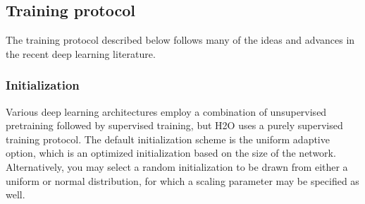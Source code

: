 \documentclass{article}[11pt]
\begin{document}
\subsection{Training protocol} 
The training protocol described below follows many of the ideas and advances in the recent deep learning literature.

\subsubsection{Initialization}
\label{sssec:Initialization}
\noindent
Various deep learning architectures employ a combination of unsupervised pretraining followed by supervised training, but H2O uses a purely supervised training protocol. The default initialization scheme is the uniform adaptive option, which is an optimized initialization based on the size of the network. Alternatively, you may select a random initialization to be drawn from either a uniform or normal distribution, for which a scaling parameter may be specified as well.
\end{document}
